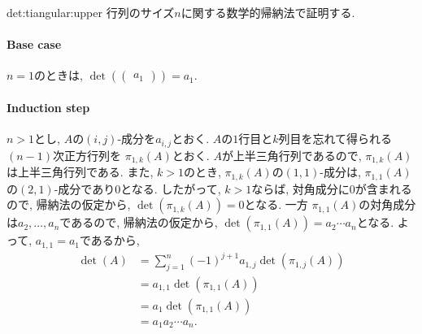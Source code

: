 \begin{proofof}{det:tiangular:upper}
  行列のサイズ$n$に関する数学的帰納法で証明する.
  \paragraph{Base case}
  $n=1$のときは, $\det(\begin{pmatrix}a_1\end{pmatrix})=a_1$.
    \paragraph{Induction step}
    $n>1$とし, $A$の$(i,j)$-成分を$a_{i,j}$とおく.
    $A$の$1$行目と$k$列目を忘れて得られる$(n-1)$次正方行列を
    $\pi_{1,k}(A)$とおく.
    $A$が上半三角行列であるので,
    $\pi_{1,k}(A)$は上半三角行列である.
    また, $k>1$のとき,
    $\pi_{1,k}(A)$の$(1,1)$-成分は,
    $\pi_{1,1}(A)$の$(2,1)$-成分であり$0$となる.
    したがって,
    $k>1$ならば,
    対角成分に$0$が含まれるので,
    帰納法の仮定から,
    $\det(\pi_{1,k}(A))=0$となる.
    一方
    $\pi_{1,1}(A)$の対角成分は$a_2,\ldots,a_n$であるので,
    帰納法の仮定から,
    $\det(\pi_{1,1}(A))=a_2\cdots a_n$となる.
    よって, $a_{1,1}=a_1$であるから,
    \begin{align*}
      \det(A)&=\sum_{j=1}^{n}
      (-1)^{j+1}a_{1,j}\det(\pi_{1,j}(A))\\
      &=a_{1,1}\det(\pi_{1,1}(A))\\
      &=a_{1}\det(\pi_{1,1}(A))\\
      &=a_{1}a_2\cdots a_n.
    \end{align*}
\end{proofof}


